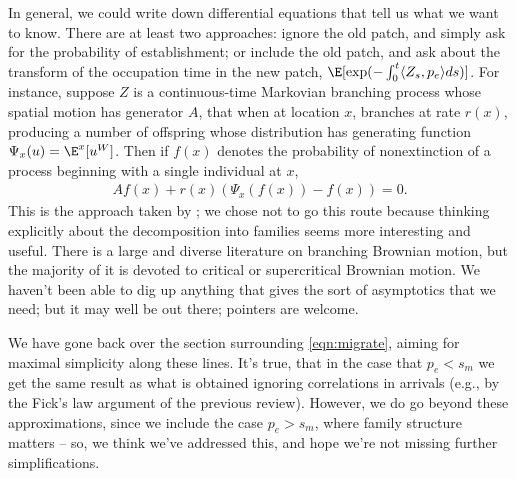 \reply
In general, we could write down differential equations
that tell us what we want to know.
There are at least two approaches: 
ignore the old patch, and simply ask for the probability of establishment;
or include the old patch, and ask about the transform of the occupation time in the new patch,
$\E[\exp(-\int_0^t \langle Z_s, p_e \rangle ds)]$.
For instance,
suppose $Z$ is a continuous-time Markovian branching process
whose spatial motion has generator $A$,
that when at location $x$, branches at rate $r(x)$,
producing a number of 
offspring whose distribution has generating function $\Psi_x(u)=\E^x[u^W]$.
Then if $f(x)$ denotes the probability of nonextinction
of a process beginning with a single individual at $x$,
\begin{align*}
    Af(x) + r(x) (\Psi_x(f(x))-f(x)) = 0 .
\end{align*}
This is the approach taken by \citep{barton1987establishment};
we chose not to go this route because thinking explicitly about the decomposition into families
seems more interesting and useful.
There is a large and diverse literature on branching Brownian motion,
but the majority of it is devoted to critical or supercritical Brownian motion.
We haven't been able to dig up anything that gives the sort of asymptotics that we need;
but it may well be out there; pointers are welcome.



\reply
We have gone back over the section surrounding \eqref{eqn:migrate},
aiming for maximal simplicity along these lines.
It's true, that in the case that $p_e < s_m$ we get the same result
as what is obtained ignoring correlations in arrivals
(e.g., by the Fick's law argument of the previous review).
However, we do go beyond these approximations, since we include the case $p_e > s_m$,
where family structure matters --
so, we think we've addressed this,
and hope we're not missing further simplifications.



